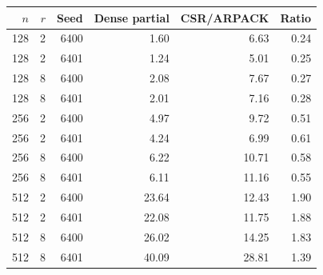 \begin{tabular}{rrrrrr}\toprule
$n$ & $r$ & Seed & Dense partial & CSR/ARPACK & Ratio\\\midrule
128 & 2 & 6400 & 1.60 & 6.63 & 0.24 \\
128 & 2 & 6401 & 1.24 & 5.01 & 0.25 \\
128 & 8 & 6400 & 2.08 & 7.67 & 0.27 \\
128 & 8 & 6401 & 2.01 & 7.16 & 0.28 \\
256 & 2 & 6400 & 4.97 & 9.72 & 0.51 \\
256 & 2 & 6401 & 4.24 & 6.99 & 0.61 \\
256 & 8 & 6400 & 6.22 & 10.71 & 0.58 \\
256 & 8 & 6401 & 6.11 & 11.16 & 0.55 \\
512 & 2 & 6400 & 23.64 & 12.43 & 1.90 \\
512 & 2 & 6401 & 22.08 & 11.75 & 1.88 \\
512 & 8 & 6400 & 26.02 & 14.25 & 1.83 \\
512 & 8 & 6401 & 40.09 & 28.81 & 1.39 \\
\bottomrule\end{tabular}
